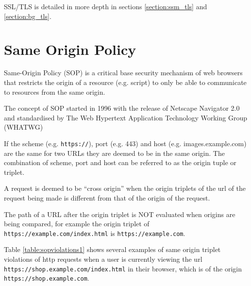 \documentclass{mscreport}
\begin{document}
\noindent
SSL/TLS is detailed in more depth in sections \ref{section:ssm_tls} and \ref{section:bg_tls}.

\section{Same Origin Policy}
\label{section:same_origin_policy}
\vspace{0.3cm} \noindent
Same-Origin Policy (SOP) is a critical base security mechanism of web browsers that restricts the origin of a resource (e.g. script) to only be able to communicate to resources from the same origin.

\vspace{0.3cm} \noindent
The concept of SOP started in 1996 with the release of Netscape Navigator 2.0 \cite{Preston2012-cs} and standardised by The Web Hypertext Application Technology Working Group (WHATWG) \cite{Multiple1996-ju}

\vspace{0.3cm} \noindent
If the scheme (e.g. \texttt{https://}), port (e.g. 443) and host (e.g. images.example.com) are the same for two URLs they are deemed to be in the same origin. The combination of scheme, port and host can be referred to as the origin tuple or triplet.

\vspace{0.3cm} \noindent
A request is deemed to be ``cross origin'' when the origin triplets of the url of the request being made is different from that of the origin of the request.

\vspace{0.3cm} \noindent
The path of a URL after the origin triplet is NOT evaluated when origins are being compared, for example the origin triplet of \texttt{https://example.com/index.html} is \newline \texttt{https://example.com}.

\vspace{0.3cm} \noindent
Table \ref{table:sopviolations1} shows several examples of same origin triplet violations of http requests when a user is currently viewing the url \texttt{https://shop.example.com/index.html} in their browser, which is of the origin \texttt{https://shop.example.com}.
\end{document}
